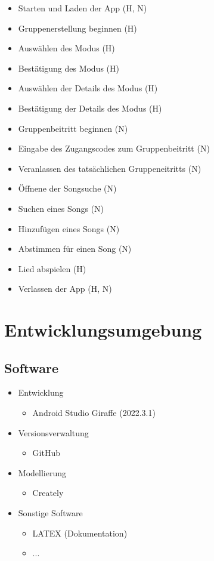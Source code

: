 \documentclass[oneside, ngerman]{sdqtechreport}
\begin{document}
\begin{itemize}
    \item Starten und Laden der App (H, N)
    \item Gruppenerstellung beginnen (H)
    \item Auswählen des Modus (H)
    \item Bestätigung des Modus (H)
    \item Auswählen der Details des Modus (H)
    \item Bestätigung der Details des Modus (H)
    \item Gruppenbeitritt beginnen (N)
    \item Eingabe des Zugangscodes zum Gruppenbeitritt (N)
    \item Veranlassen des tatsächlichen Gruppeneitritts (N)
    \item Öffnene der Songsuche (N)
    \item Suchen eines Songs (N)
    \item Hinzufügen eines Songs (N)
    \item Abstimmen für einen Song (N)
    \item Lied abspielen (H)
    \item Verlassen der App (H, N)
\end{itemize}



\chapter{Entwicklungsumgebung}
\label{chap:Entwicklungsumgebung}

\section{Software}
\label{sec:Entwicklungsumgebung:Software}

\begin{itemize}
    \item Entwicklung
    \begin{itemize}
        \item Android Studio Giraffe (2022.3.1)
    \end{itemize}
    
    \item Versionsverwaltung
    \begin{itemize}
        \item GitHub
    \end{itemize}

    \item Modellierung
    \begin{itemize}
        \item Creately
    \end{itemize}

    \item Sonstige Software
    \begin{itemize}
        \item LATEX (Dokumentation)
        \item ...
    \end{itemize}
    
\end{itemize}
\end{document}
